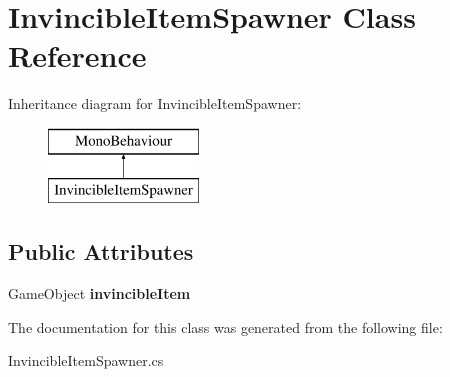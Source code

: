 \hypertarget{class_invincible_item_spawner}{}\section{Invincible\+Item\+Spawner Class Reference}
\label{class_invincible_item_spawner}
Inheritance diagram for Invincible\+Item\+Spawner\+:\begin{figure}[H]
\begin{center}
\leavevmode
\includegraphics[height=2.000000cm]{class_invincible_item_spawner}
\end{center}
\end{figure}
\subsection*{Public Attributes}
\begin{DoxyCompactItemize}
\item 
\mbox{\label{class_invincible_item_spawner_a9f165ee1f5eca266513a5c4d931fe889}} 
Game\+Object {\bfseries invincible\+Item}
\end{DoxyCompactItemize}


The documentation for this class was generated from the following file\+:\begin{DoxyCompactItemize}
\item 
Invincible\+Item\+Spawner.\+cs\end{DoxyCompactItemize}
